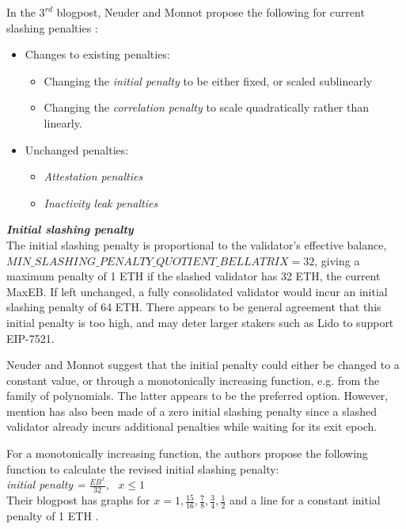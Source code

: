 \noindent
In the $3^{rd}$ blogpost, Neuder and Monnot propose the following for current slashing penalties \cite{Neuder2023d}: 
\begin{itemize}
\item Changes to existing penalties:
	\begin{itemize}
	\item Changing the \textit{initial penalty} to be either fixed, or scaled sublinearly
	\item Changing the \textit{correlation penalty} to scale quadratically rather than linearly.
	\end{itemize}
\item Unchanged penalties:
	\begin{itemize}
	\item \textit{Attestation penalties}
	\item \textit{Inactivity leak penalties}
	\end{itemize}
\end{itemize}

\noindent
\textbf{\textit{Initial slashing penalty}} \\
The initial slashing penalty is proportional to the validator's effective balance, $MIN\_SLASHING\_PENALTY\_QUOTIENT\_BELLATRIX=32$, giving a maximum penalty of 1 ETH if the slashed validator has 32 ETH, the current MaxEB.
If left unchanged, a fully consolidated validator would incur an initial slashing penalty of 64 ETH. There appears to be general agreement that this initial penalty is too high, and may deter larger stakers such as Lido to support EIP-7521.

Neuder and Monnot suggest that the initial penalty could either be changed to a constant value, or through a monotonically increasing function, e.g.  from the family of polynomials. The latter appears to be the preferred option. However, mention has also been made of a zero initial slashing penalty since a slashed validator already incurs additional penalties while waiting for its exit epoch. 

For a monotonically increasing function, the authors propose the following function to calculate the revised initial slashing penalty:\\
\textit{initial penalty =} $\frac{EB^x}{32}, \texttt{ } x \leqslant 1$ \\

Their blogpost has graphs for $x=1, \frac{15}{16}, \frac{7}{8}, \frac{3}{4}, \frac{1}{2}$ and a line for a constant initial penalty of 1 ETH \cite{Neuder2023d}.

